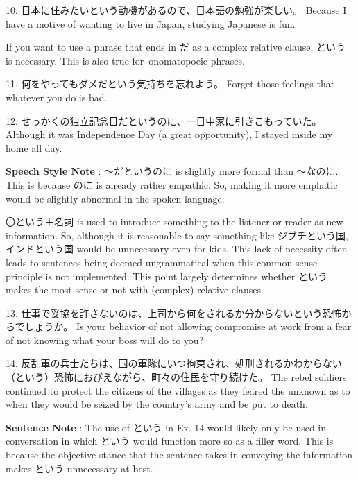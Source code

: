 \par{10. 日本に住みたいという動機があるので、日本語の勉強が楽しい。 \hfill\break
Because I have a motive of wanting to live in Japan, studying Japanese is fun. }
 
\par{ If you want to use a phrase that ends in だ as a complex relative clause, という is necessary. This is also true for onomatopoeic phrases. }
 
\par{11. 何をやってもダメだという気持ちを忘れよう。 \hfill\break
Forget those feelings that whatever you do is bad. }
 
\par{12. せっかくの独立記念日だというのに、一日中家に引きこもっていた。 \hfill\break
Although it was Independence Day (a great opportunity), I stayed inside my home all day. }
 
\par{\textbf{Speech Style Note }: ～だというのに is slightly more formal than ～なのに. This is because のに is already rather empathic. So, making it more emphatic would be slightly abnormal in the spoken language. }
 
\par{ 〇という＋名詞 is used to introduce something to the listener or reader as new information. So, although it is reasonable to say something like ジブチという国, インドという国 would be unnecessary even for kids. This lack of necessity often leads to sentences being deemed ungrammatical when this common sense principle is not implemented. This point largely determines whether という makes the most sense or not with (complex) relative clauses. }
 
\par{13. 仕事で妥協を許さないのは、上司から何をされるか分からないという恐怖からでしょうか。 \hfill\break
Is your behavior of not allowing compromise at work from a fear of not knowing what your boss will do to you? }
 
\par{14. 反乱軍の兵士たちは、国の軍隊にいつ拘束され、処刑されるかわからない（という）恐怖におびえながら、町々の住民を守り続けた。 \hfill\break
The rebel soldiers continued to protect the citizens of the villages as they feared the unknown as to when they would be seized by the country's army and be put to death. }

\par{\textbf{Sentence Note }: The use of という in Ex. 14 would likely only be used in conversation in which という would function more so as a filler word. This is because the objective stance that the sentence takes in conveying the information makes という unnecessary at best. }
 
